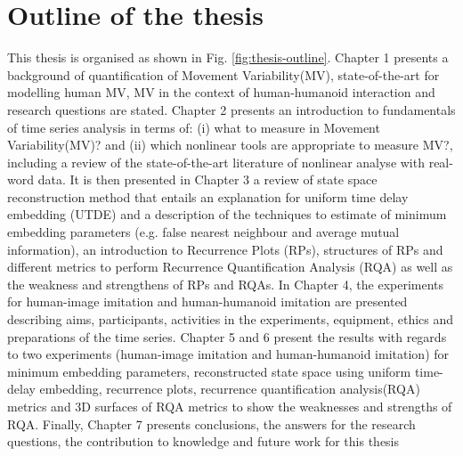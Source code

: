 \section{Outline of the thesis}
This thesis is organised as shown in Fig. \ref{fig:thesis-outline}.
Chapter 1 presents a background of quantification of 
Movement Variability(MV), state-of-the-art for modelling human MV,
MV in the context of human-humanoid interaction and research questions
are stated.
Chapter 2 presents an introduction to fundamentals of time series
analysis in terms of: (i) what to measure in Movement Variability(MV)?
and (ii) which nonlinear tools are appropriate to measure MV?, 
including a review of the state-of-the-art literature of nonlinear 
analyse with real-word data. 
It is then presented in Chapter 3 a review of state space 
reconstruction method that entails an explanation for uniform time 
delay embedding (UTDE) and a description of the techniques to estimate 
of minimum embedding parameters (e.g. false nearest neighbour and 
average mutual information), an introduction to Recurrence Plots (RPs),
structures of RPs and different metrics to perform 
Recurrence Quantification Analysis (RQA) as well as the 
weakness and strengthens of RPs and RQAs.
In Chapter 4, the experiments for human-image imitation and human-humanoid 
imitation are presented describing aims, participants, activities in the 
experiments, equipment, ethics and preparations of the time series.
Chapter 5 and 6 present the results with regards to two experiments
(human-image imitation and human-humanoid imitation) for 
minimum embedding parameters, reconstructed state space using 
uniform time-delay embedding, recurrence plots, recurrence quantification 
analysis(RQA) metrics and 3D surfaces of RQA metrics to show the
weaknesses and strengths of RQA.
Finally, Chapter 7 presents conclusions, the answers for the
research questions, the contribution to knowledge and 
future work for this thesis

